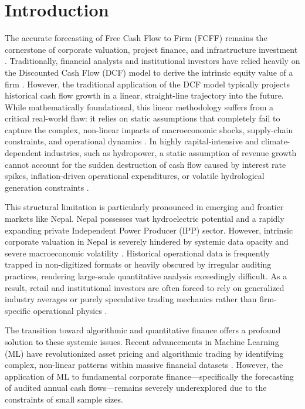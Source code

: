 \documentclass[11pt,a4paper]{article}
\begin{document}
\section{Introduction}
The accurate forecasting of Free Cash Flow to Firm (FCFF) remains the cornerstone of corporate valuation, project finance, and infrastructure investment \cite{damodaran2012, penman2010}. Traditionally, financial analysts and institutional investors have relied heavily on the Discounted Cash Flow (DCF) model to derive the intrinsic equity value of a firm \cite{koller2010}. However, the traditional application of the DCF model typically projects historical cash flow growth in a linear, straight-line trajectory into the future. While mathematically foundational, this linear methodology suffers from a critical real-world flaw: it relies on static assumptions that completely fail to capture the complex, non-linear impacts of macroeconomic shocks, supply-chain constraints, and operational dynamics \cite{fernandez2015}. In highly capital-intensive and climate-dependent industries, such as hydropower, a static assumption of revenue growth cannot account for the sudden destruction of cash flow caused by interest rate spikes, inflation-driven operational expenditures, or volatile hydrological generation constraints \cite{yescombe2013}.

This structural limitation is particularly pronounced in emerging and frontier markets like Nepal. Nepal possesses vast hydroelectric potential and a rapidly expanding private Independent Power Producer (IPP) sector. However, intrinsic corporate valuation in Nepal is severely hindered by systemic data opacity and severe macroeconomic volatility \cite{bhattarai2019, shrestha2021}. Historical operational data is frequently trapped in non-digitized formats or heavily obscured by irregular auditing practices, rendering large-scale quantitative analysis exceedingly difficult. As a result, retail and institutional investors are often forced to rely on generalized industry averages or purely speculative trading mechanics rather than firm-specific operational physics \cite{bekaert2003}.

The transition toward algorithmic and quantitative finance offers a profound solution to these systemic issues. Recent advancements in Machine Learning (ML) have revolutionized asset pricing and algorithmic trading by identifying complex, non-linear patterns within massive financial datasets \cite{gu2020, krauss2017}. However, the application of ML to fundamental corporate finance---specifically the forecasting of audited annual cash flows---remains severely underexplored due to the constraints of small sample sizes. 
\end{document}
